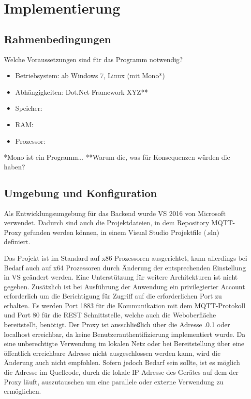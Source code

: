 \chapter{Implementierung}
\section{Rahmenbedingungen}
    Welche Voraussetzungen sind für das Programm notwendig?
    \begin{itemize}
        \item Betriebsystem: ab Windows 7, Linux (mit Mono*)
        \item Abhängigkeiten: Dot.Net Framework XYZ**
        \item Speicher: 
        \item RAM: 
        \item Prozessor: 
    \end{itemize}
    
    *Mono ist ein Programm...
    **Warum die, was für Konsequenzen würden die haben?

\section{Umgebung und Konfiguration} %
    Als Entwicklungsumgebung für das Backend wurde \ac{VS} 2016 %
    von Microsoft verwendet. Dadurch sind auch die Projektdateien, in dem Repository \glqq MQTT-Proxy\grqq{} %
    gefunden werden können, in einem Visual Studio Projektfile (.sln) definiert.
    
    Das Projekt ist im Standard auf x86 Prozessoren ausgerichtet, kann allerdings bei Bedarf auch auf x64 Prozessoren durch Änderung der entsprechenden Einstellung in \ac{VS} geändert werden.
    Eine Unterstützung für weitere Architekturen ist nicht gegeben.
    Zusätzlich ist bei Ausführung der Anwendung ein privilegierter Account erforderlich um die Berichtigung für Zugriff auf die erforderlichen Port zu erhalten.
    Es werden Port 1883 für die Kommunikation mit dem \ac{MQTT}-Protokoll und Port 80 für die \ac{REST} Schnittstelle, welche auch die Weboberfläche bereitstellt, benötigt.
    Der Proxy ist ausschließlich über die Adresse .0.1\grqq{} oder \glqq localhost\grqq{} erreichbar, da keine Benutzerauthentifizierung implementiert wurde. Da eine unberechtigte Verwendung im lokalen Netz oder bei Bereitstellung über eine öffentlich erreichbare Adresse nicht ausgeschlossen werden kann, wird die Änderung auch nicht empfohlen. Sofern jedoch Bedarf sein sollte, ist es möglich die Adresse im Quellcode, durch die lokale IP-Adresse des Gerätes auf dem der Proxy läuft, auszutauschen um eine parallele oder externe Verwendung zu ermöglichen.
    
